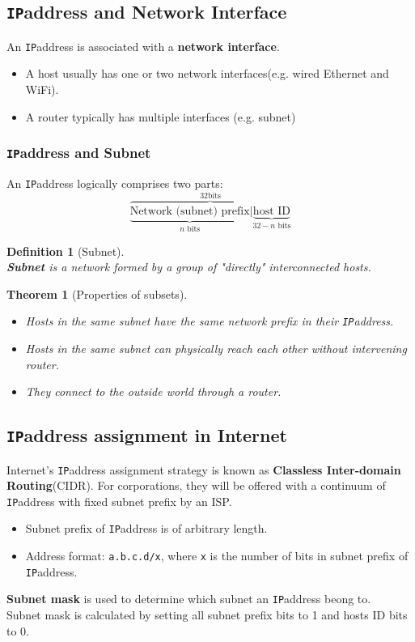 \documentclass[12pt]{article}
\newcommand\IP{\texttt{IP}}
\newtheorem{definition}{Definition}[section]
\newtheorem{theorem}{Theorem}[section]
\theoremstyle{definition}
\begin{document}
\subsection{\IP address and Network Interface}
An \IP address is associated with a \textbf{network interface}.
\begin{itemize}
  \item A host usually has one or two network interfaces(e.g. wired Ethernet and WiFi).
  \item A router typically has multiple interfaces (e.g. subnet)
\end{itemize}
\subsubsection{\IP address and Subnet}
An \IP address logically comprises two parts:
\[
\overbrace{\underbrace{\text{Network (subnet) prefix}}_{n \text{ bits}}|\underbrace{\text{host ID}}_{32-n \text{ bits}}}^{32 \text{bits}}
\]
\begin{definition}[Subnet]\hfill\\\normalfont
\textbf{Subnet} is a network formed by a group of "directly" interconnected hosts.
\end{definition}
\begin{theorem}[Properties of subsets]
\hfill\\\normalfont
\begin{itemize}
  \item Hosts in the same subnet have the \textit{same} network prefix in their \IP address.
  \item Hosts in the same subnet can physically reach each other \textit{without} intervening router.
  \item They connect to the outside world through a router.
  \end{itemize}
\end{theorem}
\subsection{\IP address assignment in Internet}
Internet's \IP address assignment strategy is known as \textbf{Classless Inter-domain Routing}(CIDR). For corporations, they will be offered with a continuum of \IP address with fixed subnet prefix by an ISP.
\begin{itemize}
  \item Subnet prefix of \IP address is of arbitrary length.
  \item Address format: \texttt{a.b.c.d/x}, where \texttt{x} is the number of bits in subnet prefix of \IP address.
\end{itemize}
\textbf{Subnet mask} is used to determine which subnet an \IP address beong to.\\Subnet mask is calculated by setting all subnet prefix bits to 1 and hosts ID bits to 0.
\end{document}
